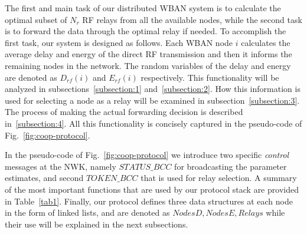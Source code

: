 \documentclass[10pt]{IEEEtran}
\newcounter{section:outage-analysis}
\begin{document}
The first and main task of our distributed WBAN system is to calculate the optimal subset of $N_r$ RF relays from all the available nodes, while the second task is to forward the data through the optimal relay if needed. To accomplish the first task, our system is designed as follows. Each WBAN node $i$ calculates the average delay and energy of the direct RF transmission and then it informs the remaining nodes in the network. The random variables of the delay and energy are denoted as $D_{rf}(i)$  and $E_{rf}(i)$ respectively. This functionality will be analyzed in subsections~\ref{subsection:1} and~\ref{subsection:2}. How this information is used for selecting a node as a relay will be examined in subsection~\ref{subsection:3}. The process of making the actual forwarding decision is described in~\ref{subsection:4}. All this functionality is concisely captured in the pseudo-code of Fig.~\ref{fig:coop-protocol}.

In the pseudo-code of Fig.~\ref{fig:coop-protocol} we introduce two specific \textit{control} messages at the NWK, namely $STATUS\_BCC$ for broadcasting the parameter estimates, and second $TOKEN\_BCC$ that is used for relay selection. A summary of the most important functions that are used by our protocol stack are provided in Table~\ref{tab1}. Finally, our protocol defines three data structures at each node in the form of linked lists, and are denoted as $NodesD,NodesE,Relays$ while their use will be explained in the next subsections.
\end{document}
